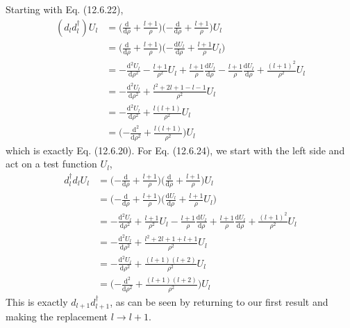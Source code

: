 \documentclass[../principles-of-quantum-mechanics.tex]{subfiles}
\begin{document}
\begin{questions}
		\begin{solution}
			Starting with Eq. (12.6.22), 
			\begin{align*}
				(d_ld_l^\dagger)U_l &= \Big(\frac{\mathrm{d}}{\mathrm{d}\rho} + \frac{l + 1}{\rho}\Big)\Big({-\frac{\mathrm{d}}{\mathrm{d}\rho}} + \frac{l + 1}{\rho}\Big)U_l \\
				&= \Big(\frac{\mathrm{d}}{\mathrm{d}\rho} + \frac{l + 1}{\rho}\Big)\Big({-\frac{\mathrm{d}U_l}{\mathrm{d}\rho}} + \frac{l + 1}{\rho}U_l\Big) \\
				&= {-\frac{\mathrm{d}^2U_l}{\mathrm{d}\rho^2}} - \frac{l + 1}{\rho^2}U_l + \frac{l + 1}{\rho}\frac{\mathrm{d}U_l}{\mathrm{d}\rho} - \frac{l + 1}{\rho}\frac{\mathrm{d}U_l}{\mathrm{d}\rho} + \frac{(l + 1)^2}{\rho^2}U_l \\
				&= {-\frac{\mathrm{d}^2U_l}{\mathrm{d}\rho^2}} + \frac{l^2 + 2l + 1 - l - 1}{\rho^2}U_l \\
				&= {-\frac{\mathrm{d}^2U_l}{\mathrm{d}\rho^2}} + \frac{l(l + 1)}{\rho^2}U_l \\
				&= \Big({-\frac{\mathrm{d}^2}{\mathrm{d}\rho^2}} + \frac{l(l + 1)}{\rho^2}\Big)U_l
			\end{align*}
			which is exactly Eq. (12.6.20). For Eq. (12.6.24), we start with the left side and act on a test function $U_l$,
			\begin{align*}
				d_l^\dagger d_lU_l &= \Big({-\frac{\mathrm{d}}{\mathrm{d}\rho}} + \frac{l + 1}{\rho}\Big)\Big(\frac{\mathrm{d}}{\mathrm{d}\rho} + \frac{l + 1}{\rho}\Big)U_l \\
				&= \Big({-\frac{\mathrm{d}}{\mathrm{d}\rho}} + \frac{l + 1}{\rho}\Big)\Big(\frac{\mathrm{d}U_l}{\mathrm{d}\rho} + \frac{l + 1}{\rho}U_l\Big) \\
				&= {-\frac{\mathrm{d}^2U_l}{\mathrm{d}\rho^2}} + \frac{l + 1}{\rho^2}U_l - \frac{l + 1}{\rho}\frac{\mathrm{d}U_l}{\mathrm{d}\rho} + \frac{l + 1}{\rho}\frac{\mathrm{d}U_l}{\mathrm{d}\rho} + \frac{(l + 1)^2}{\rho^2}U_l \\
				&= {-\frac{\mathrm{d}^2U_l}{\mathrm{d}\rho^2}} + \frac{l^2 + 2l + 1 + l + 1}{\rho^2}U_l \\
				&= {-\frac{\mathrm{d}^2U_l}{\mathrm{d}\rho^2}} + \frac{(l + 1)(l + 2)}{\rho^2}U_l \\
				&= \Big({-\frac{\mathrm{d}^2}{\mathrm{d}\rho^2}} + \frac{(l + 1)(l + 2)}{\rho^2}\Big)U_l
			\end{align*}
			This is exactly $d_{l+1}d_{l+1}^\dagger$, as can be seen by returning to our first result and making the replacement $l\to l + 1$.
		\end{solution}
		

\end{questions}
\end{document}

